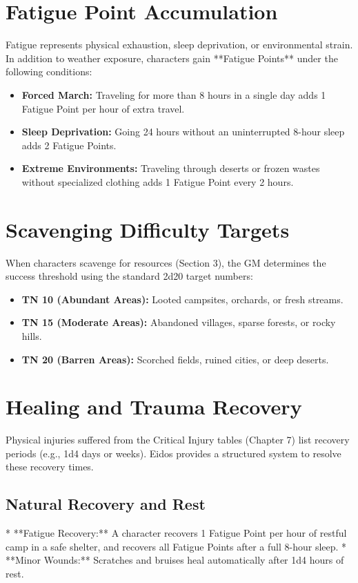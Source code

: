 \section{Fatigue Point Accumulation}

Fatigue represents physical exhaustion, sleep deprivation, or environmental strain. In addition to weather exposure, characters gain **Fatigue Points** under the following conditions:
\begin{itemize}
    \item \textbf{Forced March:} Traveling for more than 8 hours in a single day adds 1 Fatigue Point per hour of extra travel.
    \item \textbf{Sleep Deprivation:} Going 24 hours without an uninterrupted 8-hour sleep adds 2 Fatigue Points.
    \item \textbf{Extreme Environments:} Traveling through deserts or frozen wastes without specialized clothing adds 1 Fatigue Point every 2 hours.
\end{itemize}

\section{Scavenging Difficulty Targets}

When characters scavenge for resources (Section 3), the GM determines the success threshold using the standard 2d20 target numbers:
\begin{itemize}
    \item \textbf{TN 10 (Abundant Areas):} Looted campsites, orchards, or fresh streams.
    \item \textbf{TN 15 (Moderate Areas):} Abandoned villages, sparse forests, or rocky hills.
    \item \textbf{TN 20 (Barren Areas):} Scorched fields, ruined cities, or deep deserts.
\end{itemize}

\section{Healing and Trauma Recovery}

Physical injuries suffered from the Critical Injury tables (Chapter 7) list recovery periods (e.g., 1d4 days or weeks). Eidos provides a structured system to resolve these recovery times.

\subsection{Natural Recovery and Rest}
* **Fatigue Recovery:** A character recovers 1 Fatigue Point per hour of restful camp in a safe shelter, and recovers all Fatigue Points after a full 8-hour sleep.
* **Minor Wounds:** Scratches and bruises heal automatically after 1d4 hours of rest.

